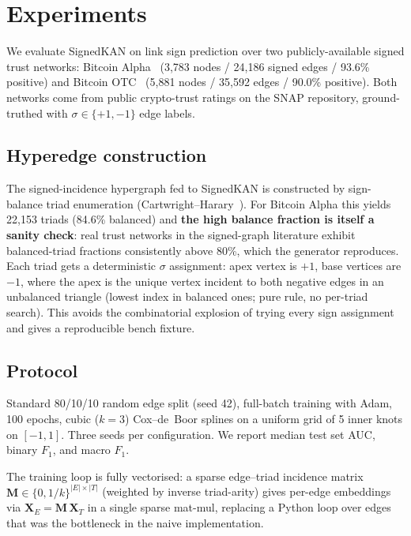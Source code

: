 
\section{Experiments}
\label{sec:experiments}

We evaluate SignedKAN on link sign prediction over two
publicly-available signed trust networks: Bitcoin
Alpha~\cite{kumar2016bitcoin} (3,783 nodes / 24,186 signed edges /
93.6\% positive) and Bitcoin
OTC~\cite{kumar2016bitcoin} (5,881 nodes / 35,592 edges / 90.0\%
positive). Both networks come from public crypto-trust ratings on
the SNAP repository, ground-truthed with $\sigma \in \{+1, -1\}$
edge labels.

\subsection{Hyperedge construction}

The signed-incidence hypergraph fed to SignedKAN is constructed by
sign-balance triad enumeration (Cartwright--Harary~\cite{cartwright1956structural}).
For Bitcoin Alpha this yields 22,153 triads (84.6\% balanced) and
\textbf{the high balance fraction is itself a sanity check}: real
trust networks in the signed-graph literature exhibit balanced-triad
fractions consistently above 80\%, which the generator reproduces.
Each triad gets a deterministic $\sigma$ assignment: apex vertex is
$+1$, base vertices are $-1$, where the apex is the unique vertex
incident to both negative edges in an unbalanced triangle (lowest
index in balanced ones; pure rule, no per-triad search). This avoids
the combinatorial explosion of trying every sign assignment and gives
a reproducible bench fixture.

\subsection{Protocol}

Standard 80/10/10 random edge split (seed 42), full-batch training
with Adam, 100 epochs, cubic ($k=3$) Cox--de~Boor splines on a uniform
grid of 5 inner knots on $[-1, 1]$. Three seeds per configuration.
We report median test set AUC, binary $F_1$, and macro $F_1$.

The training loop is fully vectorised: a sparse edge--triad
incidence matrix $\mathbf{M} \in \{0, 1/k\}^{|E| \times |T|}$
(weighted by inverse triad-arity) gives per-edge embeddings via
$\mathbf{X}_E = \mathbf{M} \, \mathbf{X}_T$ in a single sparse
mat-mul, replacing a Python loop over edges that was the bottleneck
in the naive implementation.

